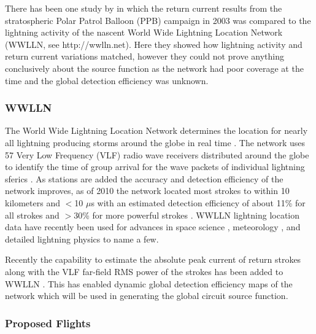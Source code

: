 There has been one study by \citet{Holzworth2005} in which the return current results from the stratospheric Polar Patrol Balloon (PPB) campaign in 2003 was compared to the lightning activity of the nascent World Wide Lightning Location Network (WWLLN, see http://wwlln.net).
Here they showed how lightning activity and return current variations matched, however they could not prove anything conclusively about the source function as the network had poor coverage at the time and the global detection efficiency was unknown.

\subsubsection*{WWLLN}

The World Wide Lightning Location Network determines the location for nearly all lightning producing storms around the globe in real time \citep{Jacobson2006c}.
The network uses 57 Very Low Frequency (VLF) radio wave receivers distributed around the globe to identify the time of group arrival  for the wave packets of individual lightning sferics \citep{Dowden2002d}.
As stations are added the accuracy and detection efficiency of the network improves, as of 2010 the network located most strokes to within 10 kilometers and $<$10 $\mu$s with an estimated detection efficiency of about 11\% for all strokes and $>$30\% for more powerful strokes \citep{Abarca2010,Rodger2009}.
WWLLN lightning location data have recently been used for advances in space science \citep{Kumar2009,Holzworth2011}, meteorology \citep{Price2009,Thomas2010d}, and detailed lightning physics \citep{Connaughton2010a} to name a few. 

Recently the capability to estimate the absolute peak current of return strokes along with the VLF far-field RMS power of the strokes has been added to WWLLN \citep{Hutchins2011}.
This has enabled dynamic global detection efficiency maps of the network which will be used in generating the global circuit source function.

\subsubsection*{Proposed Flights}

